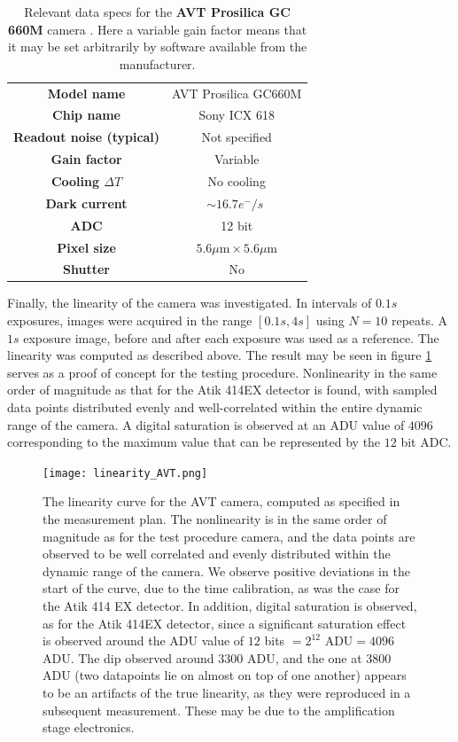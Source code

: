 \documentclass[../main.tex]{subfiles}
\begin{document}
		\begin{table}[]
			\centering
			\begin{tabular}{|c|c|}
				\hline
				\textbf{Model name }& AVT Prosilica GC660M \\
				\textbf{Chip name}&  Sony ICX 618\\
				\textbf{Readout noise (typical)}& Not specified\\
				\textbf{Gain factor}& Variable\\
				\textbf{Cooling $\Delta T$}& No cooling\\
				\textbf{Dark current}& $\sim 16.7 e^- / s\;$\\
				\textbf{ADC}& 12 bit\\
				\textbf{Pixel size}& $5.6 \mu \text{m} \times 5.6 \mu \text{m}$\\ 
				\textbf{Shutter}&No\\
				\hline
			\end{tabular}
			\caption{Relevant data specs for the \textbf{AVT Prosilica GC 660M} camera \cite{avtcamspecs}. Here a variable gain factor means that it may be set arbitrarily by software available from the manufacturer.}
			\label{table:avtcam}
		\end{table}
		
		Finally, the linearity of the camera was investigated. In intervals of $0.1s$ exposures, images were acquired in the range $[0.1s, 4s]$ using $N=10$ repeats. A $1s$ exposure image, before and after each exposure was used as a reference. The linearity was computed as described above. The result may be seen in figure \ref{fig:avtlinearity} serves as a proof of concept for the testing procedure. Nonlinearity in the same order of magnitude as that for the Atik 414EX detector is found, with sampled data points distributed evenly and well-correlated within the entire dynamic range of the camera. A digital saturation is observed at an ADU value of $4096$ corresponding to the maximum value that can be represented by the $12$ bit ADC. 
		
		\begin{figure}[hbt!]
			\centering			\texttt{[image: linearity\_AVT.png]}
			\caption{The linearity curve for the AVT camera, computed as specified in the measurement plan. The nonlinearity is in the same order of magnitude as for the test procedure camera, and the data points are observed to be well correlated and evenly distributed within the dynamic range of the camera. We observe positive deviations in the start of the curve, due to the time calibration, as was the case for the Atik 414 EX detector. In addition, digital saturation is observed, as for the Atik 414EX detector, since a significant saturation effect is observed around the ADU value of $12$ bits $=  2^{12}$ ADU$ = 4096$ ADU. The dip observed around $3300$ ADU, and the one at 3800 ADU (two datapoints lie on almost on top of one another) appears to be an artifacts of the true linearity, as they were reproduced in a subsequent measurement. These may be due to the amplification stage electronics.}
			\label{fig:avtlinearity}
		\end{figure}
	
\end{document}
